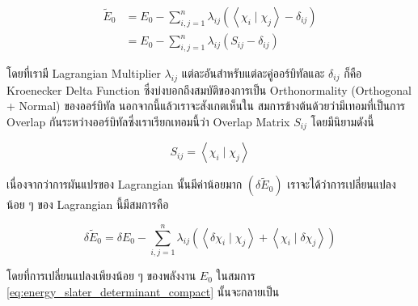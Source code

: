 \begin{equation}
    \begin{aligned}
        \tilde{E}_0 
        & = E_0-\sum_{i, j=1}^n \lambda_{i j}\left(\left\langle\chi_i \mid \chi_j\right\rangle-\delta_{i j}\right) \\
        & = E_0-\sum_{i, j=1}^n \lambda_{i j}\left(S_{i j}-\delta_{i j}\right)
    \end{aligned}
\end{equation}

\noindent โดยที่เรามี Lagrangian Multiplier $\lambda_{i j}$ แต่ละอันสำหรับแต่ละคู่ออร์บิทัลและ $\delta_{i j}$ ก็คือ Kroenecker 
Delta Function ซึ่งบ่งบอกถึงสมบัติของการเป็น Orthonormality (Orthogonal + Normal) ของออร์บิทัล นอกจากนี้แล้วเราจะสังเกตเห็นใน%
สมการข้างต้นด้วยว่ามีเทอมที่เป็นการ Overlap กันระหว่างออร์บิทัลซึ่งเราเรียกเทอมนี้ว่า Overlap Matrix $S_{i j}$ โดยมีนิยามดังนี้

\begin{equation}
    S_{i j} = \left\langle\chi_i \mid \chi_j\right\rangle
\end{equation}

\noindent เนื่องจากว่าการผันแปรของ Lagrangian นั้นมีค่าน้อยมาก $(\delta \tilde{E}_0)$ เราจะได้ว่าการเปลี่ยนแปลงน้อย ๆ ของ 
Lagrangian นี้มีสมการคือ 

\begin{equation}
    \delta \tilde{E}_0 
    = \delta E_0 
        - \sum_{i, j=1}^n \lambda_{i j}
            \left(
                \left\langle\delta \chi_i \mid \chi_j\right\rangle 
                + \left\langle\chi_i \mid \delta \chi_j\right\rangle
            \right)
\end{equation}

\noindent โดยที่การเปลี่ยนแปลงเพียงน้อย ๆ ของพลังงาน $E_0$ ในสมการ \ref{eq:energy_slater_determinant_compact} 
นั้นจะกลายเป็น

